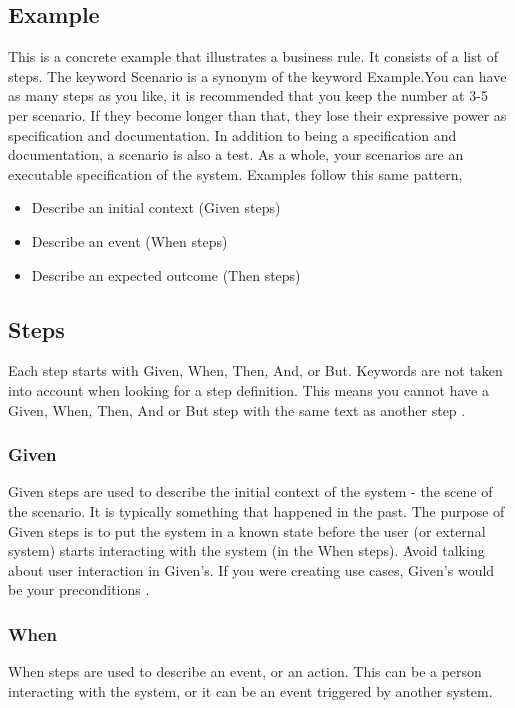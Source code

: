 \documentclass[conference, onecolumn, a4, 12pt]{IEEEtran}
\begin{document}
\subsection{Example}
This is a concrete example that illustrates a business rule. It consists of a list of steps. The keyword Scenario is a synonym of the keyword Example.You can have as many steps as you like, it is recommended that you keep the number at 3-5 per scenario. If they become longer than that, they lose their expressive power as specification and documentation.\newline
In addition to being a specification and documentation, a scenario is also a test. As a whole, your scenarios are an executable specification of the system.\newline
Examples follow this same pattern, \cite{a1}
\begin{itemize}
	\item Describe an initial context (Given steps)
	\item Describe an event (When steps)
	\item Describe an expected outcome (Then steps)
\end{itemize}

\subsection{Steps}
Each step starts with Given, When, Then, And, or But. Keywords are not taken into account when looking for a step definition. This means you cannot have a Given, When, Then, And or But step with the same text as another step \cite{a1}.

\subsubsection{Given}
Given steps are used to describe the initial context of the system - the scene of the scenario. It is typically something that happened in the past. The purpose of Given steps is to put the system in a known state before the user (or external system) starts interacting with the system (in the When steps). Avoid talking about user interaction in Given’s. If you were creating use cases, Given’s would be your preconditions \cite{a1}.

\subsubsection{When}
When steps are used to describe an event, or an action. This can be a person interacting with the system, or it can be an event triggered by another system.
\end{document}
